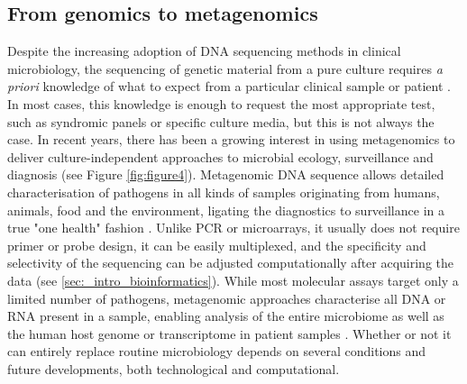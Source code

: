 \subsection{From genomics to metagenomics} \label{ssec:_intro_metagenomics}

Despite the increasing adoption of DNA sequencing methods in clinical microbiology, the sequencing of genetic material from a pure culture requires \textit{a priori} knowledge of what to expect from a particular clinical sample or patient \citep{schuele_future_2021}. 
In most cases, this knowledge is enough to request the most appropriate test, such as syndromic panels or specific culture media, but this is not always the case. 
In recent years, there has been a growing interest in using metagenomics to deliver culture-independent approaches to microbial ecology, surveillance and diagnosis (see Figure \ref{fig:figure4})\citep{loman_twenty_2015, loman_high-throughput_2012}.
Metagenomic DNA sequence allows detailed characterisation of pathogens in all kinds of samples originating from humans, animals, food and the environment, ligating the diagnostics to surveillance in a true "one health" fashion \citep{rossen__2018}. 
Unlike \ac{PCR} or microarrays, it usually does not require primer or probe design, it can be easily multiplexed, and the specificity and selectivity of the sequencing can be adjusted computationally after acquiring the data \citep{dunne_next-generation_2012} (see \ref{sec:_intro_bioinformatics}).  
While most molecular assays target only a limited number of pathogens, metagenomic approaches characterise all DNA or RNA present in a sample, enabling analysis of the entire microbiome as well as the human host genome or transcriptome in patient samples \citep{chiu_clinical_2019}. 
Whether or not it can entirely replace routine microbiology depends on several conditions and future developments, both technological and computational.

